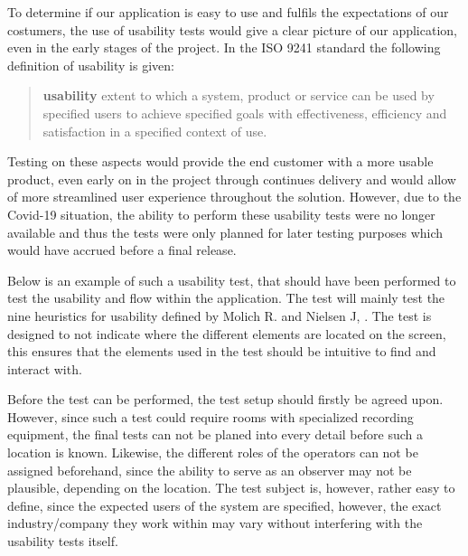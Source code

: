 To determine if our application is easy to use and fulfils the expectations of our costumers, the use of usability tests would give a clear picture of our application, even in the early stages of the project.
In the ISO 9241 standard the following definition of usability is given:
\begin{quote}
    \textbf{usability} extent to which a system, product or service can be used by specified users to achieve specified goals with effectiveness, efficiency and satisfaction in a specified context of use. \cite{ISO9241}
\end{quote}
Testing on these aspects would provide the end customer with a more usable product, even early on in the project through continues delivery and would allow of more streamlined user experience throughout the solution.
However, due to the Covid-19 situation, the ability to perform these usability tests were no longer available and thus the tests were only planned for later testing purposes which would have accrued before a final release.

Below is an example of such a usability test, that should have been performed to test the usability and flow within the application.
The test will mainly test the nine heuristics for usability defined by Molich R. and Nielsen J, \cite{Usability}.
The test is designed to not indicate where the different elements are located on the screen, this ensures that the elements used in the test should be intuitive to find and interact with.

Before the test can be performed, the test setup should firstly be agreed upon.
However, since such a test could require rooms with specialized recording equipment, the final tests can not be planed into every detail before such a location is known.
Likewise, the different roles of the operators can not be assigned beforehand, since the ability to serve as an observer may not be plausible, depending on the location.
The test subject is, however, rather easy to define, since the expected users of the system are specified, however, the exact industry/company they work within may vary without interfering with the usability tests itself.

